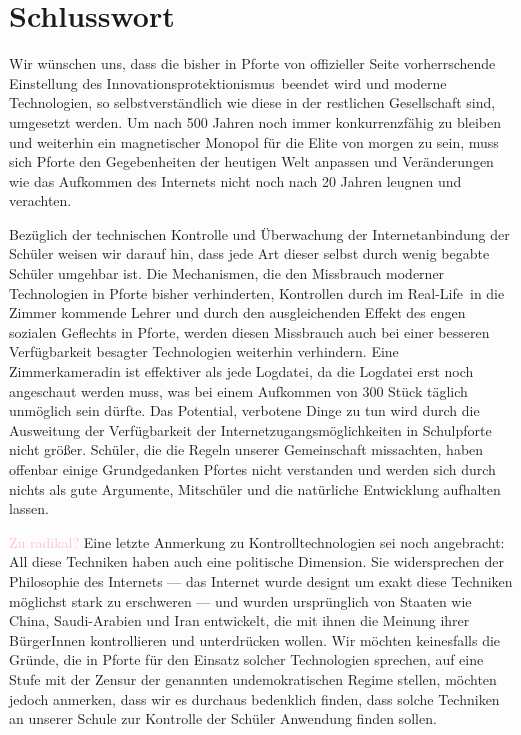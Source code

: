 \documentclass[10pt,a4paper,notitlepage]{scrartcl}
\newcommand{\gfo}{\grqq\ }
\newcommand{\gfu}{\glqq}
\newcommand{\sebastian}[1]{\textcolor{pink}{#1}}
\begin{document}
\section{Schlusswort}
\begin{multicols}{2}
Wir wünschen uns, dass die bisher in Pforte von offizieller Seite vorherrschende Einstellung des \gfu Innovationsprotektionismus\gfo beendet wird und moderne Technologien, so selbstverständlich wie diese in der restlichen Gesellschaft sind, umgesetzt werden. Um nach 500 Jahren noch immer konkurrenzfähig zu bleiben und weiterhin ein magnetischer Monopol für die Elite von morgen zu sein, muss sich Pforte den Gegebenheiten der heutigen Welt anpassen und Veränderungen wie das Aufkommen des Internets nicht noch nach 20 Jahren leugnen und verachten.

Bezüglich der technischen Kontrolle und Überwachung der Internetanbindung der Schüler weisen wir darauf hin, dass jede Art dieser selbst durch wenig begabte Schüler umgehbar ist. Die Mechanismen, die den Missbrauch moderner Technologien in Pforte bisher verhinderten, Kontrollen durch im \gfu Real-Life\gfo in die Zimmer kommende Lehrer und durch den ausgleichenden Effekt des engen sozialen Geflechts in Pforte, werden diesen Missbrauch auch bei einer besseren Verfügbarkeit besagter Technologien weiterhin verhindern. Eine Zimmerkameradin ist effektiver als jede Logdatei, da die Logdatei erst noch angeschaut werden muss, was bei einem Aufkommen von 300 Stück täglich unmöglich sein dürfte. Das Potential, verbotene Dinge zu tun wird durch die Ausweitung der Verfügbarkeit der Internetzugangsmöglichkeiten in Schulpforte nicht größer. Schüler, die die Regeln unserer Gemeinschaft missachten, haben offenbar einige Grundgedanken Pfortes nicht verstanden und werden sich durch nichts als gute Argumente, Mitschüler und die natürliche Entwicklung aufhalten lassen.

\sebastian{Zu radikal?}
Eine letzte Anmerkung zu Kontrolltechnologien sei noch angebracht: All diese Techniken haben auch eine politische Dimension. Sie widersprechen der Philosophie des Internets --- das Internet wurde designt um exakt diese Techniken möglichst stark zu erschweren --- und wurden ursprünglich von Staaten wie China, Saudi-Arabien und Iran entwickelt, die mit ihnen die Meinung ihrer BürgerInnen kontrollieren und unterdrücken wollen. Wir möchten keinesfalls die Gründe, die in Pforte für den Einsatz solcher Technologien sprechen, auf eine Stufe mit der Zensur der genannten undemokratischen Regime stellen, möchten jedoch anmerken, dass wir es durchaus bedenklich finden, dass solche Techniken an unserer Schule zur Kontrolle der Schüler Anwendung finden sollen.
\end{multicols}
%
%
%
\end{document}
